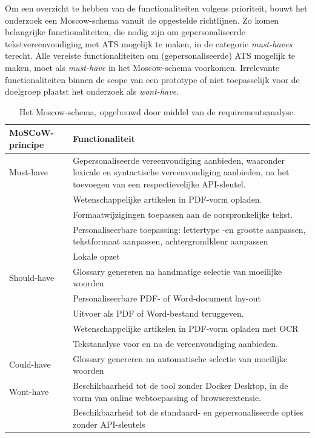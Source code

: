 Om een overzicht te hebben van de functionaliteiten volgens prioriteit, bouwt het onderzoek een Moscow-schema vanuit de opgestelde richtlijnen. Zo komen belangrijke functionaliteiten, die nodig zijn om gepersonaliseerde tekstvereenvoudiging met ATS mogelijk te maken, in de categorie \textit{must-haves} terecht. Alle vereiste functionaliteiten om (gepersonaliseerde) ATS mogelijk te maken, moet als \textit{must-have} in het Moscow-schema voorkomen. Irrelevante functionaliteiten binnen de scope van een prototype of niet toepasselijk voor de doelgroep plaatst het onderzoek als \textit{wont-have}.

\begin{center}
	\begin{table}[H]
		\begin{tabular}{ | m{4cm} | m{11cm} | } 
			\hline
			\textbf{MoSCoW-principe} & Functionaliteit \\
			\hline
			Must-have & Gepersonaliseerde vereenvoudiging aanbieden, waaronder lexicale en syntactische vereenvoudiging aanbieden, na het toevoegen van een respectievelijke API-sleutel. \\
			& Wetenschappelijke artikelen in PDF-vorm opladen. \\
			& Formaatwijzigingen toepassen aan de oorspronkelijke tekst. \\
			& Personaliseerbare toepassing: lettertype -en grootte aanpassen, tekstformaat aanpassen, achtergrondkleur aanpassen \\
			& Lokale opzet \\
			\hline
			Should-have & Glossary genereren na handmatige selectie van moeilijke woorden \\
			& Personaliseerbare PDF- of Word-document lay-out \\
			& Uitvoer als PDF of Word-bestand teruggeven. \\
			& Wetenschappelijke artikelen in PDF-vorm opladen met OCR \\
			& Tekstanalyse voor en na de vereenvoudiging aanbieden. \\
			\hline
			Could-have & Glossary genereren na automatische selectie van moeilijke woorden \\
			\hline
			Wont-have & Beschikbaarheid tot de tool zonder Docker Desktop, in de vorm van online webtoepassing of browserextensie. \\
			& Beschikbaarheid tot de standaard- en gepersonaliseerde opties zonder API-sleutels \\
			\hline
		\end{tabular}
		\caption{Het Moscow-schema, opgebouwd door middel van de requirementsanalyse.}
		\label{img:moscow-table}
	\end{table}
\end{center}

